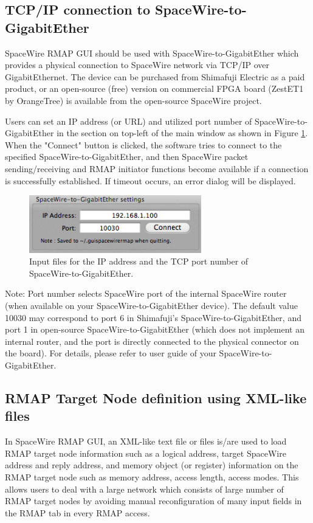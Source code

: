 \documentclass[a4paper,10pt]{article}
\begin{document}
\subsection{TCP/IP connection to SpaceWire-to-GigabitEther}\label{section:setting_section}
SpaceWire RMAP GUI should be used with SpaceWire-to-GigabitEther which provides a physical connection to SpaceWire network via TCP/IP over GigabitEthernet. The device can be purchased from Shimafuji Electric as a paid product, or an open-source (free) version on commercial FPGA board (ZestET1 by OrangeTree) is available from the open-source SpaceWire project.

Users can set an IP address (or URL) and utilized port number of SpaceWire-to-GigabitEther in the section on top-left of the main window as shown in Figure \ref{figure:section_SpaceWire-to-GigabitEther}. When the "Connect" button is clicked, the software tries to connect to the specified SpaceWire-to-GigabitEther, and then SpaceWire packet sending/receiving and RMAP initiator functions become available if a connection is successfully established. If timeout occurs, an error dialog will be displayed.

\begin{figure}[htb]
\begin{center}
\includegraphics[height=2.5cm]{figures/SpaceWireRMAPGUI/Section_SpaceWire-to-GigabitEther_settings.png}
\caption{Input files for the IP address and the TCP port number of SpaceWire-to-GigabitEther.}
\label{figure:section_SpaceWire-to-GigabitEther}
\end{center}
\end{figure}

Note: Port number selects SpaceWire port of the internal SpaceWire router (when available on your SpaceWire-to-GigabitEther device). The default value 10030 may correspond to port 6 in Shimafuji's SpaceWire-to-GigabitEther, and port 1 in open-source SpaceWire-to-GigabitEther (which does not implement an internal router, and the port is directly connected to the physical connector on the board). For details, please refer to user guide of your SpaceWire-to-GigabitEther.

\subsection{RMAP Target Node definition using XML-like files}\label{section:configuration_section}
In SpaceWire RMAP GUI, an XML-like text file or files is/are used to load RMAP target node information such as a logical address, target SpaceWire address and reply address, and memory object (or register) information on the RMAP target node such as memory address, access length, access modes. This allows users to deal  with a large network which consists of large number of RMAP target nodes by avoiding manual reconfiguration of many input fields in the RMAP tab in every RMAP access.
\end{document}
